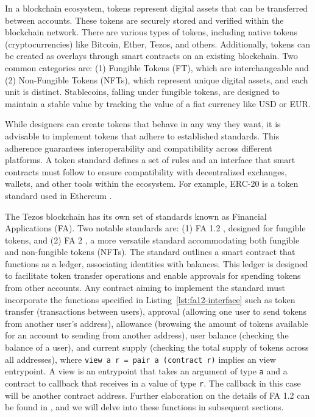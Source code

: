 \documentclass[a4paper,USenglish,cleveref, autoref, thm-restate]{lipics-v2021}
\begin{document}
In a blockchain ecosystem, tokens represent digital assets that can be
transferred between accounts. These tokens are securely stored and
verified within the blockchain network. There are various types of
tokens, including native tokens (cryptocurrencies) like Bitcoin,
Ether, Tezos, and others. Additionally, tokens can be created as
overlays through smart contracts on an existing blockchain. Two common
categories are: (1) Fungible Tokens (FT), which are interchangeable
and (2) Non-Fungible Tokens (NFTs), which represent unique digital
assets, and each unit is distinct. Stablecoins, falling under fungible
tokens, are designed to maintain a stable value by tracking the value
of a fiat currency like USD or EUR.

While designers can create tokens that behave in any way they want, it
is advisable to implement tokens that adhere to established standards.
This adherence guarantees interoperability and compatibility across
different platforms. A token standard defines a set of rules and an
interface that smart contracts must follow to ensure compatibility
with decentralized exchanges, wallets, and other tools within the
ecosystem. For example, ERC-20 \cite{erc} is a token standard used in Ethereum \cite{eth-whitepaper}.  


The Tezos blockchain has its own set of standards known as Financial
Applications (FA). Two notable standards are: (1) FA 1.2 \cite{fa}, designed for
fungible tokens, and (2) FA 2 \cite{fas}, a more versatile standard accommodating
both fungible and non-fungible tokens (NFTs). The standard outlines a
smart contract that functions as a ledger, associating identities with
balances. This ledger is designed to facilitate token transfer
operations and enable approvals for spending tokens from other
accounts. Any contract aiming to implement the standard must
incorporate the functions specified in
Listing~\ref{lst:fa12-interface} such as token transfer (transactions
between users), approval (allowing one user to send tokens from
another user's address),  allowance (browsing the amount of tokens
available for an account to sending from another address), user
balance (checking the balance of a user), and current supply (checking
the total supply of tokens across all addresses), where
\lstinline/view a r = pair a (contract r)/ implies an view entrypoint.
A view is an entrypoint that takes an
argument of type \lstinline/a/ and a contract to callback that receives in a value
of type \lstinline/r/. The callback in this case will be another
contract address. Further elaboration on the details of FA 1.2 can be
found in \cite{fatzip}, and we will delve into
these functions in subsequent 
sections.
\end{document}
